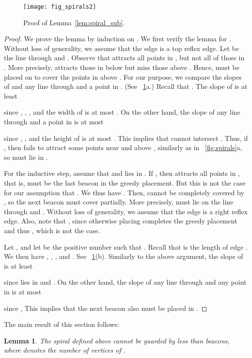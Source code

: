 \documentclass[11pt]{article}
\newtheorem{lemma}{Lemma}
\theoremstyle{definition}
\begin{document}
\begin{figure}[tb]
\centering
\texttt{[image: fig\_spirals2]}
\caption{Proof of Lemma~\ref{lem:spiral_sub}.}
\label{fig:spirals2}
\end{figure}

\begin{proof}
We prove the lemma by induction on .
We first verify the lemma for .
Without loss of generality, we assume that the edge  is a top reflex edge.
Let  be the line through  and .
Observe that  attracts all points in , but not all of those in .
More precisely,  attracts those in  below  but miss those above .
Hence,  must be placed on  to cover the points in  above .
For our purpose, we compare the slopes of  and any line through  and a point in .
(See \figurename~\ref{fig:spirals2}a.)
Recall that .
The slope of  is at least

since , , , and
the width  of  is at most .
On the other hand, the slope of any line through  and a point in  is at most

since , , and the height  of 
is at most .
This implies that  cannot intersect .
Thus, if , then  fails to attract some points near  and above ,
similarly as in \figurename~\ref{fig:spirals}a, so  must lie in .

For the inductive step, assume that  and   lies in .
If , then  attracts all points in ,
that is,  must be the last beacon in the greedy placement.
But this is not the case for our assumption that .
We thus have .
Then,  cannot be completely covered by , so the next beacon 
must cover  partially.
More precisely,  must lie on the line  through  and .
Without loss of generality, we assume that the edge  is a right reflex edge.
Also, note that , since otherwise placing  completes the greedy placement
and thus , which is not the case.

Let , and
let  be the positive number such that .
Recall that  is the length of edge .
We then have , , ,
and .
See \figurename~\ref{fig:spirals2}(b).
Similarly to the above argument,
the slope of  is at least

since  lies in  and
.
On the other hand, the slope of any line through  and any point in  is at most

since ,
This implies that the next beacon  also must be placed in . 
\end{proof}



The main result of this section follows:
\begin{lemma} \label{lem:coverage_lower_bound}
 The spiral  defined above cannot be guarded by less than
  beacons,
 where  denotes the number of vertices of .
\end{lemma}
\end{document}
